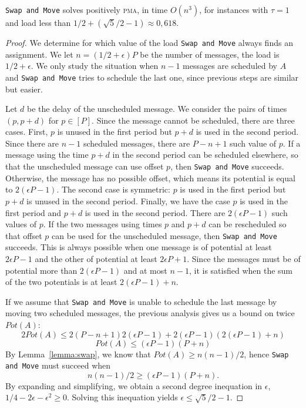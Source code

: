 \documentclass[a4paper,UKenglish,cleveref, autoref, thm-restate]{lipics-v2019}
\newcommand\pma{\textsc{pma}\xspace}
\newcommand\swapandmove{\texttt{Swap and Move}\xspace}
\begin{document}
\begin{theorem}
\swapandmove solves positively \pma, in time $O(n^3)$, for instances with $\tau =1$ and load less than $1/2 + (\sqrt{5}/2 -1) \approx 0,618$.
\end{theorem}

\begin{proof}
We determine for which value of the load \swapandmove always finds an assignment. We let $n = (1/2 + \epsilon)P$ be the number of messages, the load is $1/2 + \epsilon$. We only study the situation when $n-1$ messages are scheduled by $A$ and \swapandmove tries to schedule the last one, since previous steps are similar but easier. 

Let $d$ be the delay of the unscheduled message. We consider the pairs 
of times $(p,p+d)$ for $p \in [P]$. Since the message
cannot be scheduled, there are three cases. First, $p$ is unused in the first period but $p+d$ is used in the second period. Since there are $n-1$ scheduled messages, there are $P-n+1$ such value of $p$. If a message using the time $p+d$ in the second period can be scheduled elsewhere, so that the unscheduled message can use offset $p$, then \swapandmove succeeds.
Otherwise, the message has no possible offset, which means its potential is equal to $2(\epsilon P -1)$.
The second case is symmetric: $p$ is used in the first period but $p+d$ is unused in the second period. 
Finally, we have the case $p$ is used in the first period and $p+d$ is used in the second period.  There are $2(\epsilon P -1)$ such values of $p$. If the two messages using times 
$p$ and $p+d$ can be rescheduled so that offset $p$ can be used for the unscheduled message,
then \swapandmove succeeds. This is always possible when one message is of potential at least $2\epsilon P -1$ and the other of potential at least $2\epsilon P + 1$. Since the messages must be of potential more than $2(\epsilon P -1)$ and at most $n-1$, it is satisfied when the sum of the two potentials is at least $2(\epsilon P -1) + n$.

If we assume that \swapandmove is unable to schedule the last message by moving two scheduled messages, the previous analysis gives us a bound on twice $Pot(A)$: 
$$ 2Pot(A) \leq 2(P-n+1) 2(\epsilon P -1) + 2(\epsilon P -1)(2(\epsilon P -1) + n) $$
$$ Pot(A) \leq (\epsilon P -1) (P + n)$$
By Lemma~\ref{lemma:swap}, we know that $Pot(A) \geq n(n-1)/2$, hence 
\swapandmove must succeed when
$$n(n-1)/2 \geq  (\epsilon P -1) (P + n).$$
By expanding and simplifying, we obtain a second degree inequation in $\epsilon$, $1/4 - 2\epsilon - \epsilon ^2 \geq  0$.
Solving this inequation yields $\epsilon \leq \sqrt{5}/2 -1$.



\end{proof}
\end{document}
